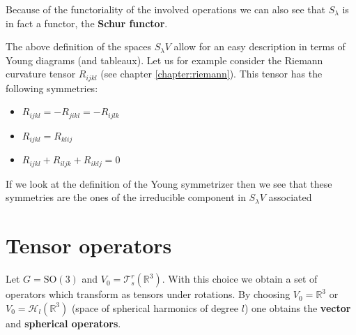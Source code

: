     Because of the functoriality of the involved operations we can also see that $S_\lambda$ is in fact a functor, the \textbf{Schur functor}.

    \begin{example}
        The above definition of the spaces $S_\lambda V$ allow for an easy description in terms of Young diagrams (and tableaux). Let us for example consider the Riemann curvature tensor $R_{ijkl}$ (see chapter \ref{chapter:riemann}). This tensor has the following symmetries:
        \begin{itemize}
            \item $R_{ijkl} = -R_{jikl} = -R_{ijlk}$
            \item $R_{ijkl} = R_{klij}$
            \item $R_{ijkl} + R_{iljk} + R_{iklj} = 0$
        \end{itemize}
        If we look at the definition of the Young symmetrizer then we see that these symmetries are the ones of the irreducible component in $S_\lambda V$ associated
    \end{example}

\section{Tensor operators}

    \begin{example}
        Let $G=\text{SO}(3)$ and $V_0=\mathcal{T}^r_s(\mathbb{R}^3)$. With this choice we obtain a set of operators which transform as tensors under rotations. By choosing $V_0=\mathbb{R}^3$ or $V_0=\mathcal{H}_l(\mathbb{R}^3)$ (space of spherical harmonics of degree $l$) one obtains the \textbf{vector} and \textbf{spherical operators}.
    \end{example}

